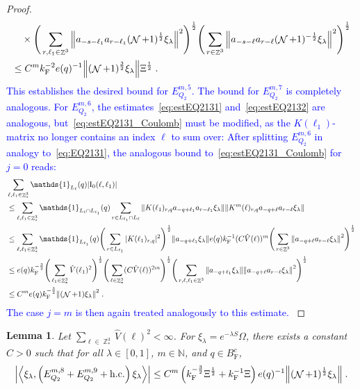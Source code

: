\documentclass[12pt,a4paper]{article}
\numberwithin{equation}{section}
\newcommand{\NNN}{\mathbb{N}}
\newcommand{\1}{\mathbb{I}}
\newcommand{\F}{\mathrm{F}}
\newcommand{\I}{\mathrm{I}}
\DeclareMathOperator{\Z}{\mathbb{Z}}
\DeclareMathOperator{\NN}{\mathcal{N}}
\newcommand{\half}{\frac{1}{2}}
\newcommand{\eva}[1]{\left\langle #1 \right\rangle}
\theoremstyle{plain}
\newtheorem{lemma}[theorem]{Lemma}
\theoremstyle{definition}
\theoremstyle{remark}
\theoremstyle{plain}
\theoremstyle{definition}
\theoremstyle{remark}
\begin{document}
\begin{proof}
{\begin{align}
	&\quad \times \Bigg( \sum_{r,\ell_1 \in \Z^3} \norm{ a_{-s-\ell_1} a_{r-\ell_1} (\NN+1)^{\half} \xi_\lambda}^2 \Bigg)^{\half}
		\Bigg( \sum_{r \in \Z^3} \norm{ a_{-s-\ell}a_{r-\ell} (\NN+1)^{-\half} \xi_\lambda }^2 \Bigg)^{\half} \nonumber\\
	&\leq C^m k_{\F}^{-2} e(q)^{-1}
		\norm{(\NN+1)^{\frac 32} \xi_\lambda} \Xi^{\half} \;. \label{eq:estEQ2132}
\end{align} 
}
\textcolor{blue}{This establishes the desired bound for $ E^{m,5}_{Q_2} $. The bound for $ E^{m,7}_{Q_2} $ is completely analogous. For $ E^{m,6}_{Q_2} $, the estimates~\eqref{eq:estEQ2131} and~\eqref{eq:estEQ2132} are analogous, but~\eqref{eq:estEQ2131_Coulomb} must be modified, as the $ K(\ell_1) $-matrix no longer contains an index $ \ell $ to sum over: After splitting $ E^{m,6}_{Q_2} $ in analogy to~\eqref{eq:EQ2131}, the analogous bound to~\eqref{eq:estEQ2131_Coulomb} for $ j = 0 $ reads:
\begin{align}
	&\sum_{\ell,\ell_1 \in \Z^3_*} \mathds{1}_{L_\ell}(q) |\I_0(\ell, \ell_1)| \nonumber\\
	&\leq \sum_{\ell,\ell_1 \in \Z^3_*} \mathds{1}_{L_\ell \cap L_{\ell_1}}(q) \sum\limits_{r\in L_{\ell_1} \cap L_\ell}
		\norm{ K(\ell_1)_{r,q} a_{-q+\ell_1} a_{r-\ell_1} \xi_\lambda}
		\norm{ K^m(\ell)_{r,q} a_{-q+\ell}a_{r-\ell} \xi_\lambda } \nonumber\\
	&\leq \sum_{\ell,\ell_1 \in \Z^3_*} \mathds{1}_{L_{\ell_1}}(q) 
		\Bigg( \sum_{r\in L_{\ell_1}} |K(\ell_1)_{r,q}|^2 \Bigg)^{\half}
		\norm{  a_{-q+\ell_1} \xi_\lambda}
		e(q) k_{\F}^{-1} (C \hat{V}(\ell))^m 
	\Bigg( \sum_{r\in \Z^3} \norm{a_{-q+\ell}a_{r-\ell} \xi_\lambda }^2 \Bigg)^{\half} \nonumber\\
	&\leq e(q) k_{\F}^{-\frac 32}
		\Bigg( \sum_{\ell_1 \in \Z^3_*} \hat{V}(\ell_1)^2 \Bigg)^{\half}
		\Bigg( \sum_{\ell \in \Z^3_*} (C \hat{V}(\ell))^{2m} \Bigg)^{\half}
		\Bigg( \sum_{r, \ell, \ell_1 \in \Z^3} \norm{ a_{-q+\ell_1} \xi_\lambda}
		\norm{a_{-q+\ell}a_{r-\ell} \xi_\lambda }^2 \Bigg)^{\half} \nonumber\\
	&\leq C^m e(q) k_{\F}^{-\frac 32}
		\norm{(\NN+1) \xi_\lambda }^2
		\;. \label{eq:estEQ2131_Coulomb_bis}
\end{align}
The case $ j = m $ is then again treated analogously to this estimate.
}
\end{proof}


\begin{lemma} \label{lem:EQ218}
Let $ \sum_{\ell \in \Z^3_*} \hat{V}(\ell)^2 < \infty $. For $\xi_\lambda = e^{-\lambda S} \Omega$, there exists a constant $ C > 0 $ such that for all $ \lambda \in [0,1] $, $ m \in \NNN $, and $ q \in B_{\F}^c $,
\begin{align}
	\abs{\eva{\xi_\lambda,\left(E^{m,8}_{Q_2}+E^{m,9}_{Q_2}+\mathrm{h.c.}\right) \xi_\lambda }}
	\leq C^m \left( k_{\F}^{-\frac 32} \Xi^\half
		+ k_{\F}^{-1} \Xi \right)
		e(q)^{-1} \norm{(\NN+1)^{\half} \xi_\lambda} \;.\label{eq:estEQ218}
\end{align}
\end{lemma}
\end{document}

